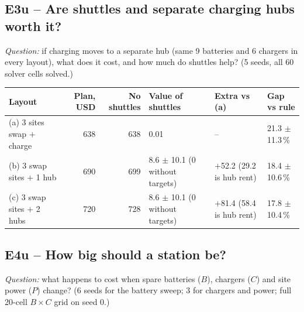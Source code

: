 \subsection*{E3u -- Are shuttles and separate charging hubs worth it?}
\noindent\textit{Question:} if charging moves to a separate hub (same 9 batteries and 6 chargers in every layout), what does it cost, and how much do shuttles help? (5 seeds, all 60 solver cells solved.)

\begin{center}\small
\begin{tabular}{@{}L{3.4cm}rrL{2.8cm}L{2.7cm}L{2.4cm}@{}}
\toprule
Layout & Plan, USD & No shuttles & Value of shuttles & Extra vs (a) & Gap vs rule \\
\midrule
(a) 3 sites swap $+$ charge & 638 & 638 & 0.01 & -- & 21.3 $\pm$ 11.3\,\% \\
(b) 3 swap sites $+$ 1 hub & 690 & 699 & 8.6 $\pm$ 10.1 (0 without targets) & $+$52.2 (29.2 is hub rent) & 18.4 $\pm$ 10.6\,\% \\
(c) 3 swap sites $+$ 2 hubs & 720 & 728 & 8.6 $\pm$ 10.1 (0 without targets) & $+$81.4 (58.4 is hub rent) & 17.8 $\pm$ 10.4\,\% \\
\bottomrule
\end{tabular}
\end{center}

\subsection*{E4u -- How big should a station be?}
\noindent\textit{Question:} what happens to cost when spare batteries ($B$), chargers ($C$) and site power ($P$) change? (6 seeds for the battery sweep; 3 for chargers and power; full 20-cell $B \times C$ grid on seed 0.)

